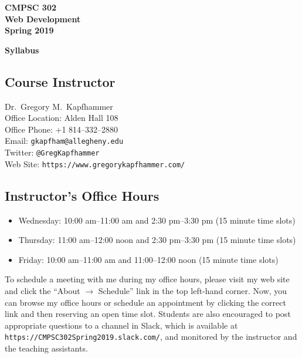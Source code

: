 \documentclass[11pt]{article}
\newcommand{\url}[1]{\lstinline{#1}}
\newcommand{\syllabustitle}[1]
{
  \begin{center}
    \begin{center}
      \bf
      CMPSC 302\\Web Development\\
      Spring 2019\\
      \medskip
    \end{center}
    \bf
    #1
  \end{center}
}
\begin{document}
\thispagestyle{empty}

\syllabustitle{Syllabus}

\subsection*{Course Instructor}
Dr.\ Gregory M.\ Kapfhammer\\
\noindent Office Location: Alden Hall 108 \\
\noindent Office Phone: +1 814--332--2880 \\
\noindent Email: \url{gkapfham@allegheny.edu} \\
\noindent Twitter: \url{@GregKapfhammer} \\
\noindent Web Site: \url{https://www.gregorykapfhammer.com/}

\subsection*{Instructor's Office Hours}

\begin{itemize}

  \itemsep0em

  \item Wednesday: 10:00 am--11:00 am and 2:30 pm--3:30 pm (15 minute time slots)

  \item Thursday: 11:00 am--12:00 noon and 2:30 pm--3:30 pm (15 minute time slots)

  \item Friday: 10:00 am--11:00 am and 11:00--12:00 noon (15 minute time slots)

\end{itemize}

\vspace*{-.05in}

\noindent To schedule a meeting with me during my office hours, please visit my
web site and click the ``About $\rightarrow$ Schedule'' link in the top
left-hand corner. Now, you can browse my office hours or schedule an appointment
by clicking the correct link and then reserving an open time slot. Students are
also encouraged to post appropriate questions to a channel in Slack, which is
available at \url{https://CMPSC302Spring2019.slack.com/}, and monitored by the
instructor and the teaching assistants.

\vspace*{-.1in}
\end{document}

